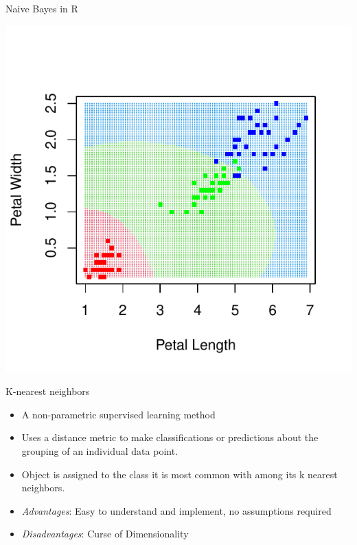 \documentclass[aspectratio=1610, t]{beamer}\usepackage[]{graphicx}\usepackage[]{color}
\makeatletter
\def\maxwidth{ %
  \ifdim\Gin@nat@width>\linewidth
    \linewidth
  \else
    \Gin@nat@width
  \fi
}
\newenvironment{knitrout}{}{} %
\makeatother
\begin{document}
\begin{frame} {Naive Bayes in R} 




\vspace{-2cm}

\begin{knitrout}
\color{fgcolor}

{\centering \includegraphics[width=\maxwidth]{figure/nb1-1} 

}


\end{knitrout}

\end{frame}

\begin{frame}{K-nearest neighbors}
\begin{itemize}
\item A non-parametric supervised learning method

\item Uses a distance metric to make classifications or predictions about the grouping of an individual data point.

\item Object is assigned to the class it is most common with among its k nearest neighbors.

\item \textit{Advantages}: Easy to understand and implement, no assumptions required
\item \textit{Disadvantages}: Curse of Dimensionality
\end{itemize}


\end{frame}
\end{document}
